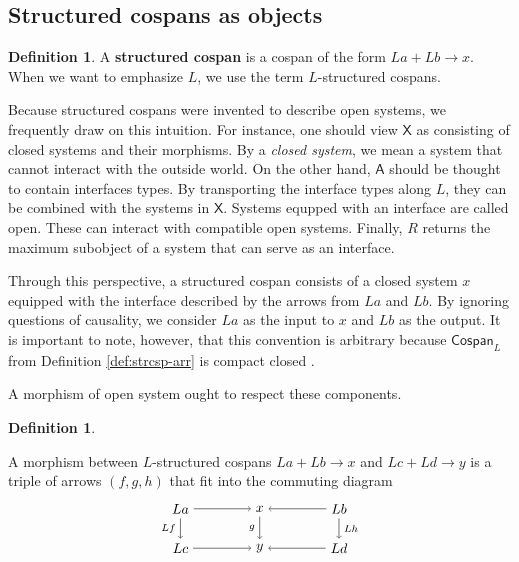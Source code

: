 \documentclass{amsart}
\newcommand{\A}{\cat{A}}
\newcommand{\X}{\cat{X}}
\newcommand{\Csp}{\cat{Cospan}}
\newcommand{\defn}[1]{\textbf{#1}}
\newcommand{\cat}[1]{\mathsf{#1}}
\newcommand{\csp}[3]{#1 + #3 \to #2}
\theoremstyle{remark}
\theoremstyle{definition}
\newtheorem{definition}[theorem]{Definition}
\begin{document}


\subsection{Structured cospans as objects}
\label{sec:StrCspAsObject}

\begin{definition}\label{df:strcsp}
  A \defn{structured cospan} is a cospan of the form
  $ \csp{La}{x}{Lb} $.  When we want to emphasize $ L $, we use the
  term $ L $-structured cospans.
\end{definition}

Because structured cospans were invented to describe open systems, we
frequently draw on this intuition. For instance, one should view
$ \X $ as consisting of closed systems and their morphisms. By a
\emph{closed system}, we mean a system that cannot interact with the
outside world. On the other hand, $ \A $ should be thought to contain
interfaces types. By transporting the interface types along $ L $,
they can be combined with the systems in $ \X $. Systems equpped with
an interface are called open.  These can interact with compatible open
systems.  Finally, $ R $ returns the maximum subobject of a system
that can serve as an interface. 

Through this perspective, a structured cospan consists of a closed
system $ x $ equipped with the interface described by the arrows from
$ La $ and $ Lb $. By ignoring questions of causality, we consider
$ La $ as the input to $ x $ and $ Lb $ as the output. It is important
to note, however, that this convention is arbitrary because $ \Csp_L $
from Definition \ref{def:strcsp-arr} is compact closed
\cite{CicCour_SpCspTopos}.  

A morphism of open system ought to respect these components.

\begin{definition} \label{df:morph-of-strcsp}

  A morphism between $ L $-structured cospans
  \(
    \csp{La}{x}{Lb}
  \)
  and
  \(
    \csp{Lc}{y}{Ld}
  \)
  is a triple of arrows $ ( f,g,h ) $ that fit into the commuting
  diagram
  \[
    \begin{tikzpicture}
      \node (1) at (-2,1) {\( La \)};
      \node (2) at (0,1) {\( x \)};
      \node (3) at (2,1) {\( Lb \)};
      \node (4) at (-2,0) {\( Lc \)};
      \node (5) at (0,0) {\( y \)};
      \node (6) at (2,0) {\( Ld \)};
      \draw [->] (1) to node [above] {\scriptsize{\(  \)}} (2);
      \draw [->] (3) to node [above] {\scriptsize{\(  \)}} (2);
      \draw [->] (4) to node [below] {\scriptsize{\(  \)}} (5);
      \draw [->] (6) to node [below] {\scriptsize{\(  \)}} (5);
      \draw [->] (1) to node [left] {\scriptsize{\( Lf \)}} (4);
      \draw [->] (2) to node [left] {\scriptsize{\( g \)}} (5);
      \draw [->] (3) to node [right] {\scriptsize{\( Lh \)}} (6);
    \end{tikzpicture}
  \]
\end{definition}
\end{document}
